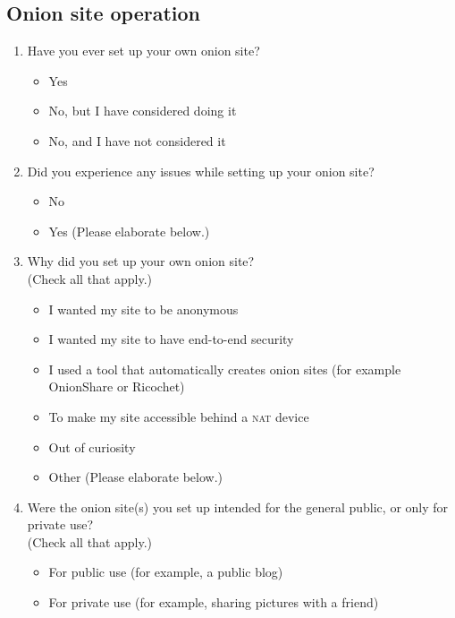 \subsection{Onion site operation}
\begin{enumerate}
    \item Have you ever set up your own onion site?
        \begin{itemize}[label=$\Circle$]
            \item Yes
            \item No, but I have considered doing it
            \item No, and I have not considered it
        \end{itemize}

    \item Did you experience any issues while setting up your onion site?
        \begin{itemize}[label=$\Circle$]
            \item No
            \item Yes (Please elaborate below.)
        \end{itemize}

    \item Why did you set up your own onion site?\\(Check all that apply.)
        \begin{itemize}[label=$\Square$]
            \item I wanted my site to be anonymous
            \item I wanted my site to have end-to-end security
            \item I used a tool that automatically creates onion sites (for
                example OnionShare or Ricochet)
            \item To make my site accessible behind a \textsc{nat} device
            \item Out of curiosity
            \item Other (Please elaborate below.)
        \end{itemize}

    \item Were the onion site(s) you set up intended for the general public, or
        only for private use?\\(Check all that apply.)
        \begin{itemize}[label=$\Square$]
            \item For public use (for example, a public blog)
            \item For private use (for example, sharing pictures with a friend)
        \end{itemize}


\end{enumerate}
